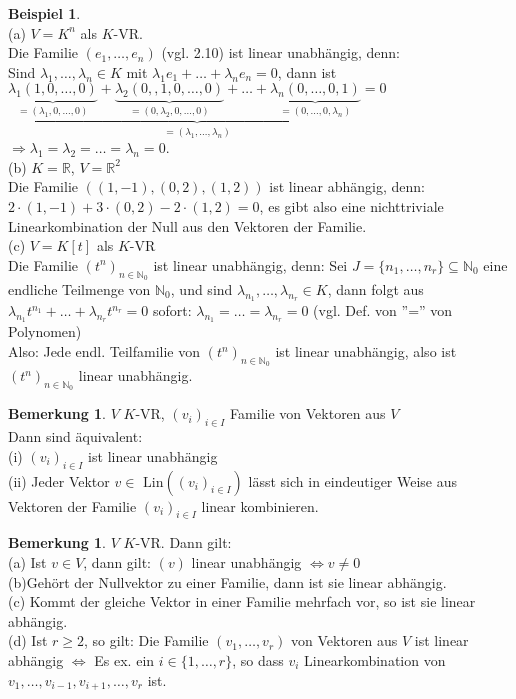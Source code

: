 \documentclass[10pt,a4paper,numbers=endperiod]{scrartcl}
\theoremstyle{definition}
\newtheorem{bem}[satz]{Bemerkung}
\newtheorem{bsp}[satz]{Beispiel}
\begin{document}
\begin{bsp}
	$ $ \\
	(a) $V=K^n$ als $K$-VR.\\
	Die Familie $(e_1,\dots,e_n)$ (vgl. 2.10) ist linear unabhängig, denn:\\
	Sind $\lambda_1,\dots, \lambda_n \in K$ mit $\lambda_1e_1+\ldots+\lambda_ne_n = 0$, dann ist\\ $\underbrace{\underbrace{\lambda_1(1,0,\dots,0)}_{=(\lambda_1,0,\dots,0)}+\underbrace{\lambda_2(0,,1,0,\dots,0)}_{=(0,\lambda_2,0,\dots,0)}+\dots+\underbrace{\lambda_n(0,\dots,0,1)}_{=(0,\dots,0,\lambda_n)} = 0}_{=(\lambda_1,\dots,\lambda_n)}$ \hspace*{5mm}$\Rightarrow \lambda_1=\lambda_2=\ldots=\lambda_n=0$.\\
	(b) $K = \mathbb{R}$, $V=\mathbb{R}^{2}$\\
	Die Familie $((1,-1),(0,2),(1,2))$ ist linear abhängig, denn: $2 \cdot(1,-1)+3 \cdot (0,2)-2 \cdot(1,2)=0$, es gibt also eine nichttriviale Linearkombination der Null aus den Vektoren der Familie.\\
	(c) $V=K[t]$ als $K$-VR\\
	Die Familie $(t^n)_{n \in \mathbb{N}_0}$ ist linear unabhängig, denn: Sei $J=\{n_1, \ldots, n_r\} \subseteq \mathbb{N}_0$ eine endliche Teilmenge von $\mathbb{N}_0$, und sind $\lambda_{n_1},\ldots,\lambda_{n_r} \in K$, dann folgt aus $\lambda_{n_1}t^{n_1}+ \dots+ \lambda_{n_r}t^{n_r} = 0$ sofort: $\lambda_{n_1}=\ldots=\lambda_{n_r}=0$ (vgl. Def. von ''='' von Polynomen)\\
	Also: Jede endl. Teilfamilie von $(t^n)_{n \in \mathbb{N}_0}$ ist linear unabhängig, also ist $(t^n)_{n \in \mathbb{N}_0}$ linear unabhängig. 
\end{bsp}

\begin{bem}
	$V$ $K$-VR, $(v_i)_{i \in I}$ Familie von Vektoren aus $V$\\
	Dann sind äquivalent: \\
	(i)  $(v_i)_{i \in I}$ ist linear unabhängig\\
	(ii) Jeder Vektor $v \in \text{ Lin}((v_i)_{i\in I})$ lässt sich in eindeutiger Weise aus Vektoren der Familie  $(v_i)_{i \in I}$ linear kombinieren.
\end{bem}
\newpage
\begin{bem}
	$V$ $K$-VR. Dann gilt:\\
	(a) Ist $v \in V $, dann gilt: $(v)$ linear unabhängig $\Leftrightarrow v \neq 0$\\
	(b)Gehört der Nullvektor zu einer Familie, dann ist sie linear abhängig.\\
	(c) Kommt der gleiche Vektor in einer Familie mehrfach vor, so ist sie linear abhängig.\\
	(d) Ist $r \geq 2$, so gilt: Die Familie $(v_1, \ldots, v_r)$ von Vektoren aus $V$ ist linear abhängig $\Leftrightarrow$ Es ex. ein $i \in \{1, \ldots,r\}$, so dass $v_i$ Linearkombination von $v_1,\ldots,v_{i-1},v_{i+1}, \ldots, v_r$ ist.
\end{bem}
\end{document}
